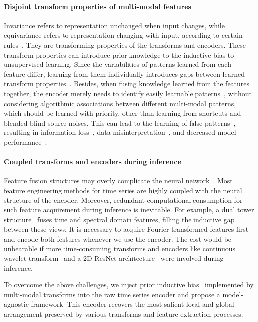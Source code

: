 \documentclass{article}
\begin{document}

\paragraph{Disjoint transform properties of multi-modal features} Invariance refers to representation unchanged when input changes, while equivariance refers to representation changing with input, according to certain rules~\cite{guto2023icml}. They are transforming properties of the transforms and encoders. These transform properties can introduce prior knowledge to the inductive bias to unsupervised learning. Since the variabilities of patterns learned from each feature differ, learning from them individually introduces gaps between learned transform properties~\cite{yang2022unsupervised}. Besides, when fusing knowledge learned from the features together, the encoder merely needs to identify easily learnable patterns~\cite{ren2022co}, without considering algorithmic associations between different multi-modal patterns, which should be learned with priority, other than learning from shortcuts and blended blind source noises. This can lead to the learning of false patterns~\cite{robinson2021can}, resulting in information loss~\cite{le1988preservation}, data misinterpretation~\cite{geirhos2020shortcut}, and decreased model performance~\cite{puli2023don}.
 

\paragraph{Coupled transforms and encoders during inference} Feature fusion structures may overly complicate the neural network~\cite{yang2022unsupervised,tang2020interpretable, park2023meta}. Most feature engineering methods for time series are highly coupled with the neural structure of the encoder. Moreover, redundant computational consumption for such feature acquirement during inference is inevitable. For example, a dual tower structure~\cite{yang2022unsupervised} fuses time and spectral domain features, filling the inductive gap between these views. It is necessary to acquire Fourier-transformed features first and encode both features whenever we use the encoder. The cost would be unbearable if more time-consuming transforms and encoders like continuous wavelet transform~\cite{grossmann1990reading} and a 2D ResNet architecture~\cite{wang2015encoding} were involved during inference.


To overcome the above challenges, we inject prior inductive bias~\cite{hu2021model} implemented by multi-modal transforms into the raw time series encoder and propose a model-agnostic framework. This encoder recovers the most salient local and global arrangement preserved by various transforms and feature extraction processes. 
\end{document}
